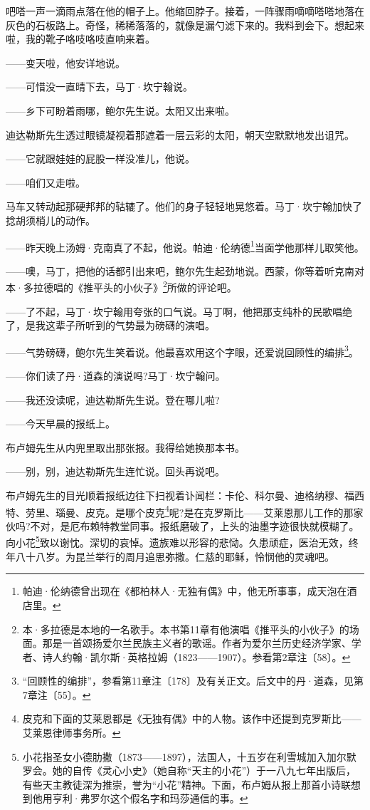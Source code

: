\par 吧嗒一声一滴雨点落在他的帽子上。他缩回脖子。接着，一阵骤雨嘀嘀嗒嗒地落在灰色的石板路上。奇怪，稀稀落落的，就像是漏勺滤下来的。我料到会下。想起来啦，我的靴子咯吱咯吱直响来着。
\par ——变天啦，他安详地说。
\par ——可惜没一直晴下去，马丁·坎宁翰说。
\par ——乡下可盼着雨哪，鲍尔先生说。太阳又出来啦。
\par 迪达勒斯先生透过眼镜凝视着那遮着一层云彩的太阳，朝天空默默地发出诅咒。
\par ——它就跟娃娃的屁股一样没准儿，他说。
\par ——咱们又走啦。
\par 马车又转动起那硬邦邦的轱辘了。他们的身子轻轻地晃悠着。马丁·坎宁翰加快了捻胡须梢儿的动作。
\par ——昨天晚上汤姆·克南真了不起，他说。帕迪·伦纳德\footnote{帕迪·伦纳德曾出现在《都柏林人·无独有偶》中，他无所事事，成天泡在酒店里。}当面学他那样儿取笑他。
\par ——噢，马丁，把他的话都引出来吧，鲍尔先生起劲地说。西蒙，你等着听克南对本·多拉德唱的《推平头的小伙子》\footnote{本·多拉德是本地的一名歌手。本书第11章有他演唱《推平头的小伙子》的场面。那是一首颂扬爱尔兰民族主义者的歌谣。作者为爱尔兰历史经济学家、学者、诗人约翰·凯尔斯·英格拉姆（1823——1907）。参看第2章注〔58〕。}所做的评论吧。
\par ——了不起，马丁·坎宁翰用夸张的口气说。马丁啊，他把那支纯朴的民歌唱绝了，是我这辈子所听到的气势最为磅礴的演唱。
\par ——气势磅礴，鲍尔先生笑着说。他最喜欢用这个字眼，还爱说回顾性的编排\footnote{“回顾性的编排”，参看第11章注〔178〕及有关正文。后文中的丹·道森，见第7章注〔55〕。}。
\par ——你们读了丹·道森的演说吗?马丁·坎宁翰问。
\par ——我还没读呢，迪达勒斯先生说。登在哪儿啦?
\par ——今天早晨的报纸上。
\par 布卢姆先生从内兜里取出那张报。我得给她换那本书。
\par ——别，别，迪达勒斯先生连忙说。回头再说吧。
\par 布卢姆先生的目光顺着报纸边往下扫视着讣闻栏：卡伦、科尔曼、迪格纳穆、福西特、劳里、瑙曼、皮克。是哪个皮克\footnote{皮克和下面的艾莱恩都是《无独有偶》中的人物。该作中还提到克罗斯比——艾莱恩律师事务所。}呢?是在克罗斯比——艾莱恩那儿工作的那家伙吗?不对，是厄布赖特教堂同事。报纸磨破了，上头的油墨字迹很快就模糊了。向小花\footnote{小花指圣女小德肋撒（1873——1897），法国人，十五岁在利雪城加入加尔默罗会。她的自传《灵心小史》（她自称“天主的小花”）于一八九七年出版后，有些天主教徒深为推崇，誉为“小花”精神。下面，布卢姆从报上那首小诗联想到他用亨利·弗罗尔这个假名字和玛莎通信的事。}致以谢忱。深切的哀悼。遗族难以形容的悲恸。久患顽症，医治无效，终年八十八岁。为昆兰举行的周月追思弥撒。仁慈的耶稣，怜悯他的灵魂吧。

